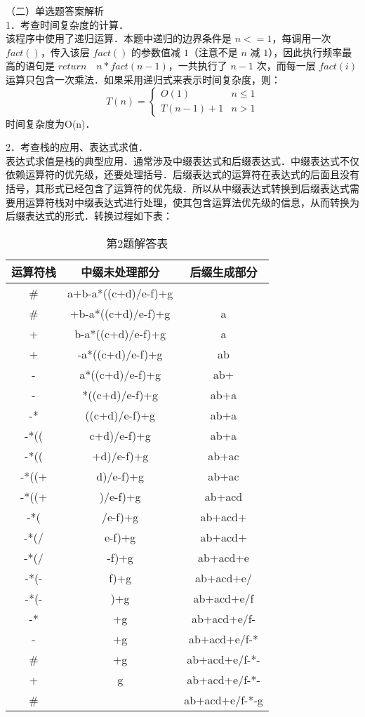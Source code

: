 （二）单选题答案解析\\
1．考查时间复杂度的计算．\\
该程序中使用了递归运算．本题中递归的边界条件是 $n<=1$，每调用一次 $fact()$，传入该层 $fact()$ 的参数值减 $1$（注意不是 $n$ 减 $1$），因此执行频率最高的语句是 $return \quad n*fact(n-1)$，一共执行了 $n-1$ 次，而每一层 $fact(i)$ 运算只包含一次乘法．如果采用递归式来表示时间复杂度，则： \\
\begin{equation}
T(n)= 
\begin{cases}
O(1) & n \le 1\\
T(n-1)+1 & n>1
\end{cases}
\end{equation}
时间复杂度为O(n)．

2．考查栈的应用、表达式求值．\\
表达式求值是栈的典型应用．通常涉及中缀表达式和后缀表达式．中缀表达式不仅依赖运算符的优先级，还要处理括号．后缀表达式的运算符在表达式的后面且没有括号，其形式已经包含了运算符的优先级．所以从中缀表达式转换到后缀表达式需要用运算符栈对中缀表达式进行处理，使其包含运算法优先级的信息，从而转换为后缀表达式的形式．转换过程如下表： \\
\begin{table}[ht]
\centering
\caption{第2题解答表}\label{CSN12_tab4}
\begin{tabular}{|c|c|c|}
\hline
运算符栈 & 中缀未处理部分 & 后缀生成部分 \\
\hline
\# &a+b-a*((c+d)/e-f)+g & \\
\hline
\# &+b-a*((c+d)/e-f)+g &a \\
\hline
+ &b-a*((c+d)/e-f)+g &a \\
\hline
+ &-a*((c+d)/e-f)+g &ab \\
\hline
- &a*((c+d)/e-f)+g &ab+ \\
\hline
- &*((c+d)/e-f)+g &ab+a \\
\hline
-* &((c+d)/e-f)+g &ab+a \\
\hline
-*(( &c+d)/e-f)+g &ab+a \\
\hline
-*(( &+d)/e-f)+g &ab+ac \\
\hline
-*((+ &d)/e-f)+g &ab+ac \\
\hline
-*((+ &)/e-f)+g &ab+acd \\
\hline
-*( &/e-f)+g &ab+acd+ \\
\hline
-*(/ &e-f)+g &ab+acd+ \\
\hline
-*(/ &-f)+g &ab+acd+e \\
\hline
-*(- &f)+g &ab+acd+e/ \\
\hline
-*(- &)+g &ab+acd+e/f \\
\hline
-* &+g &ab+acd+e/f- \\
\hline
- &+g &ab+acd+e/f-* \\
\hline
\# &+g &ab+acd+e/f-*- \\
\hline
+ &g &ab+acd+e/f-*- \\
\hline
\# &&ab+acd+e/f-*-g \\
\hline
\end{tabular}
\end{table}

